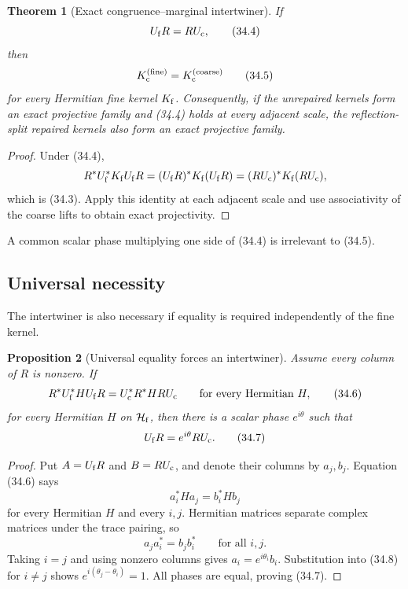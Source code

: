 \documentclass[11pt]{article}
\newtheorem{theorem}{Theorem}[section]
\newtheorem{proposition}[theorem]{Proposition}
\theoremstyle{remark}
\begin{document}
\begin{theorem}[Exact congruence--marginal intertwiner]
\label{thm:v12v34-intertwiner}
If
\begin{equation}
                         U_{\rm f}R=RU_{\rm c},   \tag{34.4}
\end{equation}
then
\begin{equation}
 K_{\rm c}^{({\rm fine})}
 =
 K_{\rm c}^{({\rm coarse})}                      \tag{34.5}
\end{equation}
for every Hermitian fine kernel \(K_{\rm f}\).  Consequently, if the
unrepaired kernels form an exact projective family and (34.4) holds
at every adjacent scale, the reflection-split repaired kernels also
form an exact projective family.
\end{theorem}

\begin{proof}
Under (34.4),
\[
 R^*U_{\rm f}^*K_{\rm f}U_{\rm f}R
 =
 (U_{\rm f}R)^*K_{\rm f}(U_{\rm f}R)
 =
 (RU_{\rm c})^*K_{\rm f}(RU_{\rm c}),
\]
which is (34.3).  Apply this identity at each adjacent scale and use
associativity of the coarse lifts to obtain exact projectivity.
\end{proof}

A common scalar phase multiplying one side of (34.4) is irrelevant
to (34.5).

\subsection{Universal necessity}

The intertwiner is also necessary if equality is required
independently of the fine kernel.

\begin{proposition}[Universal equality forces an intertwiner]
\label{prop:v12v34-universal-necessity}
Assume every column of \(R\) is nonzero.  If
\begin{equation}
 R^*U_{\rm f}^*HU_{\rm f}R
 =
 U_{\rm c}^*R^*HRU_{\rm c}
 \qquad\text{for every Hermitian }H,              \tag{34.6}
\end{equation}
for every Hermitian \(H\) on \({\cal H}_{\rm f}\), then there is a
scalar phase \(e^{i\theta}\) such that
\begin{equation}
 U_{\rm f}R=e^{i\theta}RU_{\rm c}.                \tag{34.7}
\end{equation}
\end{proposition}

\begin{proof}
Put \(A=U_{\rm f}R\) and \(B=RU_{\rm c}\), and denote their columns
by \(a_j,b_j\).  Equation (34.6) says
\[
 a_i^*Ha_j=b_i^*Hb_j
\]
for every Hermitian \(H\) and every \(i,j\).  Hermitian matrices
separate complex matrices under the trace pairing, so
\[
 a_ja_i^*=b_jb_i^*
 \qquad\text{for all }i,j.                       \tag{34.8}
\]
Taking \(i=j\) and using nonzero columns gives
\(a_i=e^{i\theta_i}b_i\).  Substitution into (34.8) for \(i\ne j\)
shows \(e^{i(\theta_j-\theta_i)}=1\).  All phases are equal, proving
(34.7).
\end{proof}
\end{document}
